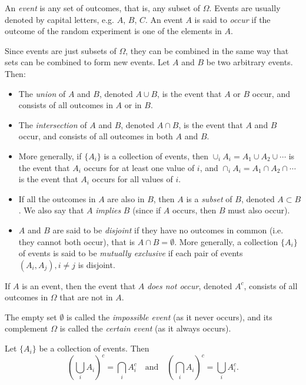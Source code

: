 \begin{definition}[Event]
    An \emph{event} is any set of outcomes, that is, any subset of $\Omega$. Events are usually denoted by capital letters, e.g. $A$, $B$, $C$. An event $A$ is said to \emph{occur} if the outcome of the random experiment is one of the elements in $A$.
\end{definition}

Since events are just subsets of $\Omega$, they can be combined in the same way that sets can be combined to form new events. Let $A$ and $B$ be two arbitrary events. Then:
\begin{itemize}
    \item The \emph{union} of $A$ and $B$, denoted $A \cup B$, is the event that $A$ or $B$ occur, and consists of all outcomes in $A$ or in $B$.
    \item The \emph{intersection} of $A$ and $B$, denoted $A \cap B$, is the event that $A$ and $B$ occur, and consists of all outcomes in both $A$ and $B$.
    \item More generally, if $\{A_i\}$ is a collection of events, then $\cup_i A_i = A_1 \cup A_2 \cup \cdots$ is the event that $A_i$ occurs for at least one value of $i$, and $\cap_i A_i = A_1 \cap A_2 \cap \cdots$ is the event that $A_i$ occurs for all values of $i$.
    \item If all the outcomes in $A$ are also in $B$, then $A$ is a \emph{subset} of $B$, denoted $A \subset B$. We also say that $A$ \emph{implies} $B$ (since if $A$ occurs, then $B$ must also occur).
    \item $A$ and $B$ are said to be \emph{disjoint} if they have no outcomes in common (i.e. they cannot both occur), that is $A \cap B = \emptyset$. More generally, a collection $\{A_i\}$ of events is said to be \emph{mutually exclusive} if each pair of events $(A_i, A_j), i \neq j$ is disjoint.
\end{itemize}

If $A$ is an event, then the event that $A$ \emph{does not occur}, denoted $A^c$, consists of all outcomes in $\Omega$ that are not in $A$.

The empty set $\emptyset$ is called the \emph{impossible event} (as it never occurs), and its complement $\Omega$ is called the \emph{certain event} (as it always occurs).

\begin{theorem}
    Let $\{A_i\}$ be a collection of events. Then
    \[
        \left( \bigcup_i A_i \right)^c = \bigcap_i A_i^c \quad \text{and} \quad \left( \bigcap_i A_i \right)^c = \bigcup_i A_i^c
    .\]
\end{theorem}

